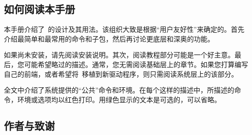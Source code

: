 \subsection{如何阅读本手册}


本手册介绍了\tikzname\ 的设计及其用法。该组织大致是根据“用户友好性”来确定的。首先介绍最简单和最常用的命令和子包，然后再讨论更底层和深奥的功能。


如果尚未安装\tikzname ，请先阅读安装说明。其次，阅读教程部分可能是一个好主意。最后，您可能希望略过\tikzname 的描述。通常，您无需阅读基础层上的章节。如果您打算编写自己的前端，或者希望将\pgfname\ 移植到新驱动程序，则只需阅读系统层上的该部分。


全文中介绍了系统提供的``公共''命令和环境。在每个这样的描述中，所描述的命令，环境或选项均以红色打印。用绿色显示的文本是可选的，可以省略。

\subsection{作者与致谢}
\label{section-authors}

